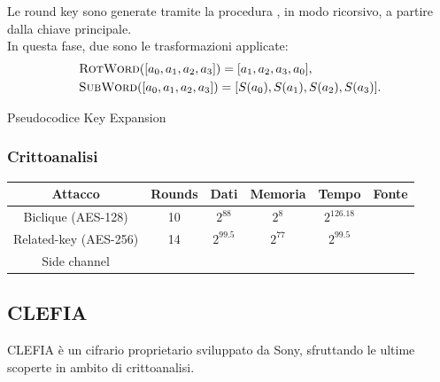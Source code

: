 \documentclass[target=bach,aauheader=,style=]{thud}
\begin{document}
			Le round key sono generate tramite la procedura , in modo ricorsivo, a partire dalla chiave principale.\\
			In questa fase, due sono le trasformazioni applicate:
			\begin{align*}
			&\Call{RotWord}{[a_0,a_1,a_2,a_3]} = [a_1,a_2,a_3,a_0],\\
			&\Call{SubWord}{[a_0,a_1,a_2,a_3]} = [S(a_0),S(a_1), S(a_2), S(a_3)].
			\end{align*}

			\begin{algorithm}
				\caption{Pseudocodice Key Expansion}
				\begin{algorithmic}
						\EndWhile
							\EndIf
						\EndWhile
					\EndProcedure
				\end{algorithmic}
			\end{algorithm}

			\subsubsection{Crittoanalisi}
			\begin{center}
				\begin{tabular}{ |c|c|c|c|c|c| } 
					\hline
					Attacco & Rounds & Dati & Memoria & Tempo & Fonte \\ 
					\hline
					\hline
					Biclique (AES-128) & 10 & $2^{88}$ & $2^8$ & $2^{126.18}$ & \cite{aes_biclique} \\ 
					\hline
					Related-key (AES-256) & 14 & $2^{99.5}$ & $2^{77}$ & $2^{99.5}$ & \cite{aes_relatedkey}\\ 
					\hline
					Side channel & & & & & \cite{aesside, aesfault}\\
					\hline
				\end{tabular}
			\end{center}
		\subsection{CLEFIA}\cite{clefia}
		CLEFIA è un cifrario proprietario sviluppato da Sony, sfruttando le ultime scoperte in ambito di crittoanalisi.
\end{document}
